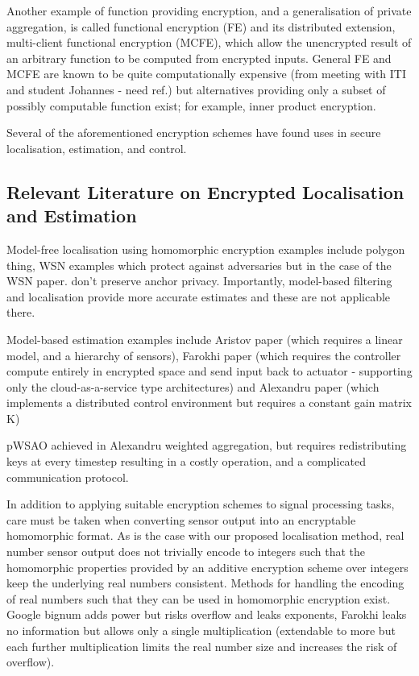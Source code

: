\documentclass[twocolumn]{autart}
\begin{document}
Another example of function providing encryption, and a generalisation of private aggregation, is called functional encryption (FE) and its distributed extension, multi-client functional encryption (MCFE), which allow the unencrypted result of an arbitrary function to be computed from encrypted inputs. General FE and MCFE are known to be quite computationally expensive (from meeting with ITI and student Johannes - need ref.) but alternatives providing only a subset of possibly computable function exist; for example, inner product encryption.

Several of the aforementioned encryption schemes have found uses in secure localisation, estimation, and control.

% 
% 

\subsection{Relevant Literature on Encrypted Localisation and Estimation}

Model-free localisation using homomorphic encryption examples include polygon thing, WSN examples which protect against adversaries but in the case of the WSN paper. don't preserve anchor privacy. Importantly, model-based filtering and localisation provide more accurate estimates and these are not applicable there.

Model-based estimation examples include Aristov paper (which requires a linear model, and a hierarchy of sensors), Farokhi paper (which requires the controller compute entirely in encrypted space and send input back to actuator - supporting only the cloud-as-a-service type architectures) and Alexandru paper (which implements a distributed control environment but requires a constant gain matrix K)

pWSAO achieved in Alexandru weighted aggregation, but requires redistributing keys at every timestep resulting in a costly operation, and a complicated communication protocol.

In addition to applying suitable encryption schemes to signal processing tasks, care must be taken when converting sensor output into an encryptable homomorphic format. As is the case with our proposed localisation method, real number sensor output does not trivially encode to integers such that the homomorphic properties provided by an additive encryption scheme over integers keep the underlying real numbers consistent. Methods for handling the encoding of real numbers such that they can be used in homomorphic encryption exist. Google bignum adds power but risks overflow and leaks exponents, Farokhi leaks no information but allows only a single multiplication (extendable to more but each further multiplication limits the real number size and increases the risk of overflow).
\end{document}
